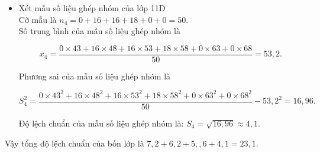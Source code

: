 \begin{bt}
{\begin{itemize}
		Độ lệch chuẩn của mẫu số liệu ghép nhóm là $S_3=\sqrt{30{,}96}\approx 5{,}6$.
	\item Xét mẫu số liệu ghép nhóm của lớp 11D\\
		
		Cỡ mẫu là $n_4=0+16+16+18+0+0=50$.\\
		
		Số trung bình của mẫu số liệu ghép nhóm là
		
		$$
		\overline{x_4}=\dfrac{0 \times 43+16 \times 48+16 \times 53+18 \times 58+0 \times 63+0 \times 68}{50}=53{,}2.
		$$
		
		Phương sai của mẫu số liệu ghép nhóm là
		
		$$
		S_4^2=\dfrac{0 \times 43^2+16 \times 48^2+16 \times 53^2+18 \times 58^2+0 \times 63^2+0 \times 68^2}{50}-53{,}2^2=16{,}96.
		$$
		
		Độ lệch chuẩn của mẫu số liệu ghép nhóm là: $S_4=\sqrt{16{,}96}\approx 4{,}1$.
		\end{itemize}
	Vậy tổng độ lệch chuẩn của bốn lớp là $7{,}2+6{,}2+5{,},6+4{,}1= 23{,}1$.
	}
\end{bt}

